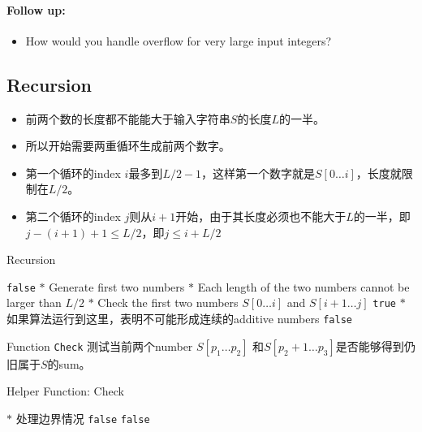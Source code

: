 \paragraph{Follow up:}
\begin{itemize}
\item How would you handle overflow for very large input integers?
\end{itemize}
\subsection{Recursion}
\begin{itemize}
\item 前两个数的长度都不能能大于输入字符串$S$的长度$L$的一半。
\item 所以开始需要两重循环生成前两个数字。
\item 第一个循环的index $i$最多到$L/2-1$，这样第一个数字就是$S[0\ldots i]$，长度就限制在$L/2$。
\item 第二个循环的index $j$则从$i+1$开始，由于其长度必须也不能大于$L$的一半，即$j-(i+1)+1\leq L/2$，即$j\leq i+L/2$
\end{itemize}
\setcounter{algorithm}{0}
\begin{algorithm}[H]
\caption{Recursion}
\begin{algorithmic}[1]
\State \Return \texttt{false}
\EndIf
\State $\ast$ Generate first two numbers
\State $\ast$ Each length of the two numbers cannot be larger than $L/2$
\State $\ast$ Check the first two numbers $S[0\ldots i]$ and $S[i+1\ldots j]$
\State \Return \texttt{true}
\EndIf
\EndFor
\EndFor
\State $\ast$ 如果算法运行到这里，表明不可能形成连续的additive numbers
\State \Return \texttt{false}
\EndProcedure
\end{algorithmic}
\end{algorithm}
Function \texttt{Check} 测试当前两个number $ S[p_1\ldots p_2] $ 和$ S[p_2+1\ldots p_3] $是否能够得到仍旧属于$S$的sum。
\setcounter{algorithm}{0}
\begin{algorithm}[H]
\caption{Helper Function: Check}
\begin{algorithmic}[1]
\State $\ast$ 处理边界情况
\State \Return \texttt{false}
\EndIf
{}
\State \Return \texttt{false}
\EndIf
{}
\end{algorithmic}
\end{algorithm}
